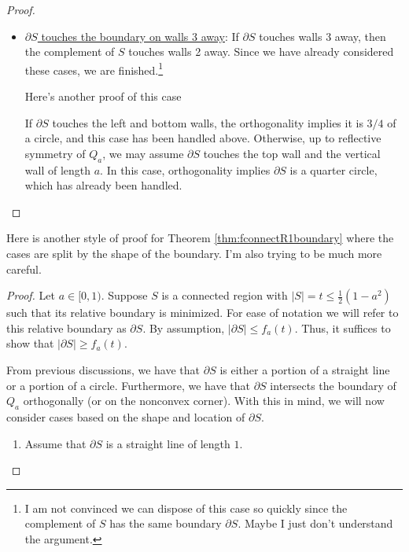 \documentclass[leqno]{article}
\numberwithin{equation}{section}
\theoremstyle{definition}
\theoremstyle{remark}
\theoremstyle{plain}
\begin{document}
{\begin{proof}
\begin{itemize}
     If $\beta \leq a < 1$, then $|\partial S| = f_a(t)$. Thus, we will assume that $0<a<\beta$.   If $\alpha\leq a\leq \beta$, then from convexity of $(\pi t)^{1/2} - P(\mathcal{L})$, we find that $|\partial S| > f_a(t)$ for $t\leq \sigma$.  In addition, $|\partial S| = f_a(t)$ for $t\in[\sigma,\tau]$, and from Proposition \ref{prop:derivativebounds},  $P(\mathcal{L})> 1$ for $t>\tau$.
     
     If $a\leq \alpha$, then Proposition \ref{prop:uniquea} implies that the area at which $P(a,t) = 1$ is smaller than the area at which $P(\alpha,t) = 1$.  As $P(\mathcal{L})$ is increasing as a function of $t$, it follows that when $t = 1/\pi$, $P(\mathcal{L}) > 1 = \max f_a(t)$.  Thus, $|\partial S| > f_a(t)$ in this case.

     
    \item \underline{$\partial S$ touches the boundary on walls 3 away}: If $\partial S$ touches walls 3 away, then the complement of $S$ touches walls 2 away. Since we have already considered these cases, we are finished.\footnote{{\color{blue} I am not convinced we can dispose of this case so quickly since the complement of $S$ has the same boundary $\partial S$.  Maybe I just don't understand the argument.}}

    {\color{blue} Here's another proof of this case}

    If $\partial S$ touches the left and bottom walls, the orthogonality implies it is $3/4$ of a circle, and this case has been handled above. Otherwise, up to reflective symmetry of $Q_a$, we may assume $\partial S$ touches the top wall and the vertical wall of length $a$.  In this case, orthogonality implies $\partial S$ is a quarter circle, which has already been handled.
\end{itemize}
\end{proof}

{\color{magenta}Here is another style of proof for Theorem \ref{thm:fconnectR1boundary} where the cases are split by the shape of the boundary. I'm also trying to be much more careful.}

\begin{proof}
    Let $a \in [0,1)$. Suppose $S$ is a connected region with $|S| = t \leq \frac{1}{2}(1-a^2)$ such that its relative boundary is minimized. For ease of notation we will refer to this relative boundary as $\partial S$. By assumption, $|\partial S| \leq f_a(t)$. Thus, it suffices to show that $|\partial S| \geq f_a(t)$. 
    
    From previous discussions, we have that $\partial S$ is either a portion of a straight line or a portion of a circle. Furthermore, we have that $\partial S$ intersects the boundary of $Q_a$ orthogonally (or on the nonconvex corner). With this in mind, we will now consider cases based on the shape and location of $\partial S$.
    \begin{enumerate}
        \item Assume that $\partial S$ is a straight line of length $1$.


\end{enumerate}
\end{proof}}
\end{document}
